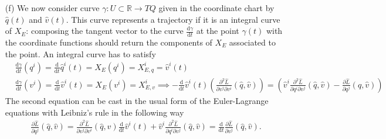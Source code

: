 \documentclass[10pt, a4paper]{article}
\begin{document}
{\begin{enumerate}
\begin{align*}
    &= -X_{E,v}^{i} \frac{\partial^2 \hat{L}}{\partial v^j \partial v^i} (\hat{q}, \hat{v}) \text{d}q^{j}_{\mathbf{q}, \mathbf{v}}+X_{E,q}^{i} \frac{\partial^2 \hat{L}}{\partial v^j \partial v^i} (\hat{q}, \hat{v}) \text{d}v^{j}_{\mathbf{q}, \mathbf{v}}
  \end{align*}
  Comparing this result with the expression for $\text{d}E$, linear independence leads to the relations
  \begin{align*}
    &\frac{\partial^2 \hat{L}}{\partial v^i \partial v^j}(\hat{q}, \hat{v}) \hat{v}^i = X_{E,q}^{i} \frac{\partial^2 \hat{L}}{\partial v^j \partial v^i} (\hat{q}, \hat{v}) \implies X_{E,q}^{i} = \hat{v}_i \quad \text{$[]^{-1}$ exists because $\frac{\partial^2 \hat{L}}{\partial v^j \partial v^i} (\hat{q}, \hat{v})$ is regular} \\
    &-X_{E,v}^{i} \frac{\partial^2 \hat{L}}{\partial v^j \partial v^i} (\hat{q}, \hat{v})  = \hat{v}^i \frac{\partial^2 \hat{L}}{\partial q^i \partial v^j} (\hat{q}, \hat{v})  - \frac{\partial \hat{L}}{\partial q^j}(\hat{q}, \hat{v}) \quad \text{can solve with $[]^{-1}$ exists because $\frac{\partial^2 \hat{L}}{\partial v^j \partial v^i} (\hat{q}, \hat{v})$ is regular.} 
  \end{align*}
  \item[(f)] We now consider curve $\gamma : U \subset \mathbb{R} \to TQ$ given in the coordinate chart by $\hat{q}(t)$ and $\hat{v}(t)$. This curve represents a trajectory if it is an integral curve of $X_E$: composing the tangent vector to the curve $\frac{\text{d}\gamma}{\text{d}t}$ at the point $\gamma(t)$ with the coordinate functions should return the components of $X_E$ associated to the point. An integral curve has to satisfy  
  \begin{align*}
    &\frac{\text{d}\gamma}{\text{d}t} (q^{i}) = \frac{\text{d}}{\text{d}t} \hat{q}^{i}(t) = X_E(q^{i}) = X_{E, q}^i = \hat{v}^i(t)\\
    &\frac{\text{d}\gamma}{\text{d}t} (v^{i}) = \frac{\text{d}}{\text{d}t}\hat{v}^{i}(t) = X_E(v^{i}) = X_{E, v}^i \implies -\frac{\text{d}}{\text{d}t}\hat{v}^{i}(t)\left(\frac{\partial^2 \hat{L}}{\partial v^j \partial v^i} (\hat{q}, \hat{v})\right)= \left( \hat{v}^i \frac{\partial^2 \hat{L}}{\partial q^i \partial v^j} (\hat{q}, \hat{v}) - \frac{\partial \hat{L}}{\partial q^j}(\hat{q}, \hat{v})\right)
  \end{align*}
  The second equation can be cast in the usual form of the Euler-Lagrange equations with Leibniz's rule in the following way 
  \begin{align*}
    \frac{\partial \hat{L}}{\partial q^j}(\hat{q}, \hat{v}) =  \frac{\partial^2 \hat{L}}{\partial v^j \partial v^i} (\hat{q}, \hat{v}) \frac{\text{d}}{\text{d}t}\hat{v}^{i}(t) + \hat{v}^i \frac{\partial^2 \hat{L}}{\partial q^i \partial v^j} (\hat{q}, \hat{v}) = \frac{\text{d}}{\text{d}t} \frac{\partial \hat{L}}{\partial v^j}(\hat{q}, \hat{v}).
  \end{align*} 


\end{enumerate}}
\end{document}
